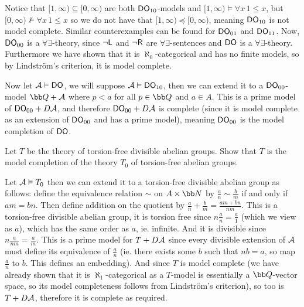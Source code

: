 \eexerc

Notice that $[1,\infty)\subseteq[0,\infty)$ are both ${\sf DO}_{10}$-models and $[1,\infty)\vDash\forall x\,1\leq x$, but $[0,\infty)\nvDash\forall x\,1\leq x$ so we do not have that
$[1,\infty)\preceq[0,\infty)$, meaning ${\sf DO}_{10}$ is not model complete.
Similar counterexamples can be found for ${\sf DO}_{01}$ and ${\sf DO}_{11}$.
Now, ${\sf DO}_{00}$ is a $\forall\exists$-theory, since $\neg{\sf L}$ and $\neg{\sf R}$ are $\forall\exists$-sentences and ${\sf DO}$ is a $\forall\exists$-theory.
Furthermore we have shown that it is $\aleph_0$-categorical and has no finite models, so by Lindstr\"om's criterion, it is model complete.

Now let ${\cal A}\vDash{\sf DO}$, we will suppose ${\cal A}\vDash{\sf DO}_{10}$, then we can extend it to a ${\sf DO}_{00}$-model ${\bb Q}+{\cal A}$ where $p<a$ for all $p\in{\bb Q}$ and $a\in A$.
This is a prime model of ${\sf DO}_{00}+D{\cal A}$, and therefore ${\sf DO}_{00}+D{\cal A}$ is complete (since it is model complete as an extension of ${\sf DO}_{00}$ and has a prime model), meaning
${\sf DO}_{00}$ is the model completion of ${\sf DO}$.

\bexerc

    Let $T$ be the theory of torsion-free divisible abelian groups.
    Show that $T$ is the model completion of the theory $T_0$ of torsion-free abelian groups.

\eexerc

Let ${\cal A}\vDash T_0$ then we can extend it to a torsion-free divisible abelian group as follows: define the equivalence relation $\sim$ on $A\times{\bb N}$ by $\frac an\sim\frac bm$ if and only if
$am=bn$.
Then define addition on the quotient by $\frac an+\frac bm=\frac{am+bn}{nm}$.
This is a torsion-free divisible abelian group, it is torsion free since $n\frac an=\frac a1$ (which we view as $a$), which has the same order as $a$, ie. infinite.
And it is divisible since $n\frac a{nm}=\frac am$.
This is a prime model for $T+D{\cal A}$ since every divisible extension of ${\cal A}$ must define its equivalence of $\frac an$ (ie. there exists some $b$ such that $nb=a$, so map $\frac an$ to $b$.
This defines an embedding).
And since $T$ is model complete (we have already shown that it is $\aleph_1$-categorical as a $T$-model is essentially a ${\bb Q}$-vector space, so its model completeness follows from Lindstr\"om's
criterion), so too is $T+D{\cal A}$, therefore it is complete as required.

\bexerc

